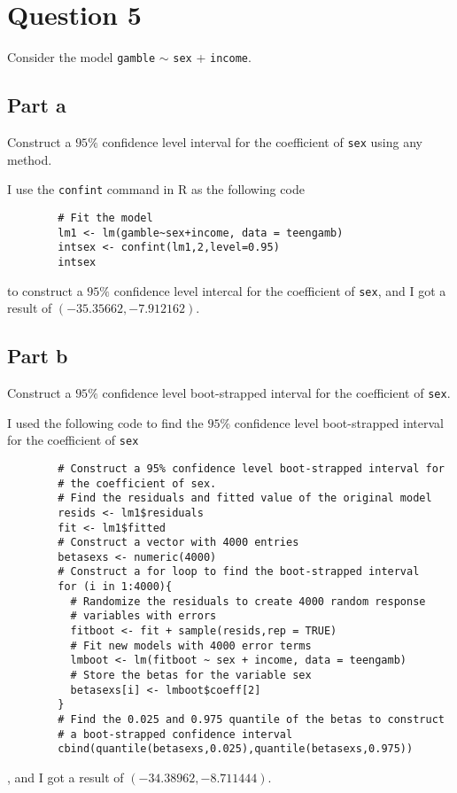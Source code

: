 \section{Question 5}

\begin{question}
    Consider the model \verb+gamble+ $\sim$ \verb+sex+ + \verb+income+.
\end{question}

\subsection{Part a}

\begin{question}
    Construct a $95\%$ confidence level interval for the coefficient of \verb+sex+ using any method.
\end{question}

\begin{answer}
    I use the \verb+confint+ command in R as the following code
    \begin{verbatim}
        # Fit the model
        lm1 <- lm(gamble~sex+income, data = teengamb)
        intsex <- confint(lm1,2,level=0.95)
        intsex
    \end{verbatim}
    to construct a $95\%$ confidence level intercal for the coefficient of \verb+sex+, and I got a result of $(-35.35662,-7.912162)$.
\end{answer}

\subsection{Part b}

\begin{question}
    Construct a $95\%$ confidence level boot-strapped interval for the coefficient of \verb+sex+.
\end{question}

\begin{answer}
    I used the following code to find the $95\%$ confidence level boot-strapped interval for the coefficient of \verb+sex+
    \begin{verbatim}
        # Construct a 95% confidence level boot-strapped interval for
        # the coefficient of sex.
        # Find the residuals and fitted value of the original model
        resids <- lm1$residuals
        fit <- lm1$fitted
        # Construct a vector with 4000 entries
        betasexs <- numeric(4000)
        # Construct a for loop to find the boot-strapped interval
        for (i in 1:4000){
          # Randomize the residuals to create 4000 random response
          # variables with errors
          fitboot <- fit + sample(resids,rep = TRUE)
          # Fit new models with 4000 error terms
          lmboot <- lm(fitboot ~ sex + income, data = teengamb)
          # Store the betas for the variable sex
          betasexs[i] <- lmboot$coeff[2]
        }
        # Find the 0.025 and 0.975 quantile of the betas to construct
        # a boot-strapped confidence interval
        cbind(quantile(betasexs,0.025),quantile(betasexs,0.975))
    \end{verbatim}
    , and I got a result of $(-34.38962,-8.711444)$.
\end{answer}